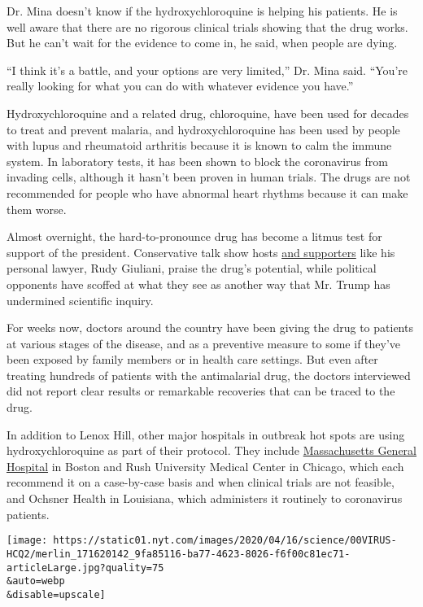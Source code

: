 Dr. Mina doesn't know if the hydroxychloroquine is helping his patients.
He is well aware that there are no rigorous clinical trials showing that
the drug works. But he can't wait for the evidence to come in, he said,
when people are dying.

``I think it's a battle, and your options are very limited,'' Dr. Mina
said. ``You're really looking for what you can do with whatever evidence
you have.''

Hydroxychloroquine and a related drug, chloroquine, have been used for
decades to treat and prevent malaria, and hydroxychloroquine has been
used by people with lupus and rheumatoid arthritis because it is known
to calm the immune system. In laboratory tests, it has been shown to
block the coronavirus from invading cells, although it hasn't been
proven in human trials. The drugs are not recommended for people who
have abnormal heart rhythms because it can make them worse.

Almost overnight, the hard-to-pronounce drug has become a litmus test
for support of the president. Conservative talk show hosts
\href{https://www.wsj.com/articles/conservative-group-pushes-for-fda-approval-of-drug-to-treat-coronavirus-11585229415?redirect=amp\#click=https://t.co/5rakc6KA4h}{and
supporters} like his personal lawyer, Rudy Giuliani, praise the drug's
potential, while political opponents have scoffed at what they see as
another way that Mr. Trump has undermined scientific inquiry.

For weeks now, doctors around the country have been giving the drug to
patients at various stages of the disease, and as a preventive measure
to some if they've been exposed by family members or in health care
settings. But even after treating hundreds of patients with the
antimalarial drug, the doctors interviewed did not report clear results
or remarkable recoveries that can be traced to the drug.

In addition to Lenox Hill, other major hospitals in outbreak hot spots
are using hydroxychloroquine as part of their protocol. They include
\href{https://www.massgeneral.org/assets/MGH/pdf/news/coronavirus/mass-general-COVID-19-treatment-guidance.pdf}{Massachusetts
General Hospital} in Boston and Rush University Medical Center in
Chicago, which each recommend it on a case-by-case basis and when
clinical trials are not feasible, and Ochsner Health in Louisiana, which
administers it routinely to coronavirus patients.

\texttt{[image: https://static01.nyt.com/images/2020/04/16/science/00VIRUS-HCQ2/merlin\_171620142\_9fa85116-ba77-4623-8026-f6f00c81ec71-articleLarge.jpg?quality=75\\\&auto=webp\\\&disable=upscale]}

